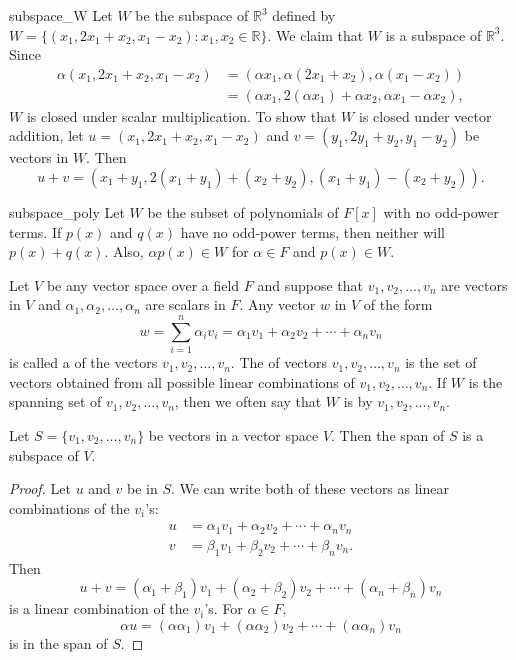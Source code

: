  
\begin{example}{subspace_W}
Let $W$ be the subspace of ${\mathbb R}^3$ defined by $W = \{ (x_1, 2 x_1
+ x_2, x_1 - x_2) : x_1, x_2 \in {\mathbb R} \}$. We claim that $W$ is a 
subspace of ${\mathbb R}^3$.  Since 
\begin{align*}
\alpha (x_1, 2 x_1 + x_2, x_1 - x_2) 
& =  (\alpha x_1, \alpha(2 x_1 + x_2), \alpha( x_1 - x_2)) \\
& =  (\alpha x_1, 2(\alpha x_1) + \alpha x_2, \alpha x_1 -\alpha x_2),
\end{align*}
$W$ is closed under scalar multiplication. To show that $W$ is closed
under vector addition, let $u = (x_1, 2 x_1 + x_2, x_1 - x_2)$ and $v
= (y_1, 2 y_1 + y_2, y_1 - y_2)$ be vectors in $W$. Then
\[
u + v = 
(x_1 + y_1, 2( x_1 + y_1) +( x_2 + y_2), (x_1 + y_1) - (x_2+ y_2)).
\]
\end{example}
 
 
 
\begin{example}{subspace_poly}
Let $W$ be the subset of polynomials of $F[x]$ with no odd-power
terms. If $p(x)$ and $q(x)$ have no odd-power terms, then neither will 
$p(x) + q(x)$.  Also, $\alpha p(x) \in W$ for $\alpha \in F$ and $p(x)
\in W$.
\end{example}
  

Let $V$ be any vector space over a field $F$ and suppose that $v_1,
v_2, \ldots, v_n$ are vectors in $V$ and $\alpha_1, \alpha_2, \ldots,
\alpha_n$ are scalars in $F$. Any vector $w$ in $V$ of the form
\[
w = \sum_{i=1}^n \alpha_i v_i = \alpha_1 v_1 + \alpha_2 v_2 + \cdots + \alpha_n v_n
\]
is called a  of the
vectors $v_1, v_2, \ldots, v_n$. The  of vectors $v_1, v_2, \ldots, v_n$ is the
set of vectors obtained from all possible linear combinations of
$v_1, v_2, \ldots, v_n$. If $W$ is the spanning set of $v_1, v_2,
\ldots, v_n$, then we often say that $W$ is  by $v_1,
v_2, \ldots, v_n$. 
 
 
\begin{proposition}
Let $S= \{v_1, v_2, \ldots, v_n \}$ be vectors in a vector space $V$.
Then the span of $S$ is a subspace of $V$. 
\end{proposition}


\begin{proof}
Let $u$ and $v$ be in $S$. We can write both of these vectors as 
linear combinations of the $v_i$'s:
\begin{align*}
u & =  \alpha_1 v_1 + \alpha_2 v_2 + \cdots + \alpha_n v_n \\
v & =  \beta_1 v_1 + \beta_2 v_2 + \cdots + \beta_n v_n.
\end{align*}
Then
\[
u+ v =( \alpha_1 + \beta_1) v_1 + (\alpha_2+ \beta_2) v_2 + \cdots +
(\alpha_n + \beta_n) v_n 
\]
is a linear combination of the $v_i$'s. For $\alpha \in F$,
\[
\alpha u = (\alpha \alpha_1) v_1 + ( \alpha \alpha_2) v_2 + \cdots +
(\alpha \alpha_n ) v_n 
\]
is in the span of $S$.
\end{proof}


